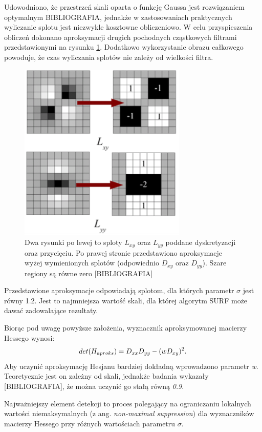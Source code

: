 Udowodniono, że przestrzeń skali oparta o funkcję Gaussa jest rozwiązaniem optymalnym {BIBLIOGRAFIA}, jednakże w zastosowaniach praktycznych wyliczanie splotu jest niezwykle kosztowne obliczeniowo. W celu przyspieszenia obliczeń dokonano aproksymacji drugich pochodnych cząstkowych filtrami przedstawionymi na rysunku \ref{im: GaussianApproximation}. Dodatkowo wykorzystanie obrazu całkowego powoduje, że czas wyliczania splotów nie zależy od wielkości filtra. 
\begin{figure}[h]
	\includegraphics[width=8cm]{SurfLxyLyy}
	\centering
	\caption{Dwa rysunki po lewej to sploty \textit{$L_{xy}$} oraz \textit{$L_{yy}$} poddane dyskretyzacji oraz przycięciu. Po prawej stronie przedstawiono aproksymacje wyżej wymienionych splotów (odpowiednio \textit{$D_{xy}$} oraz \textit{$D_{yy}$}). Szare regiony są równe zero [BIBLIOGRAFIA]}
	\label{im: GaussianApproximation}
\end{figure}
Przedstawione aproksymacje odpowiadają splotom, dla których parametr $\sigma$ jest równy 1.2. Jest to najmniejsza wartość skali, dla której algorytm SURF może dawać zadowalające rezultaty.

Biorąc pod uwagę powyższe założenia, wyznacznik aproksymowanej macierzy Hessego wynosi:
\begin{equation}\textsl{}
det(H_{aproks}) = D_{xx}D_{yy} - (wD_{xy})^2.
\end{equation}
Aby uczynić aproksymację Hesjanu bardziej dokładną wprowadzono parametr \textit{w}. Teoretycznie jest on zależny od skali, jednakże badania wykazały [BIBLIOGRAFIA], że można uczynić go stałą równą \textit{0.9}.  

Najważniejszy element detekcji to proces polegający na ograniczaniu lokalnych wartości niemaksymalnych (z ang. \textit{non-maximal suppression}) dla wyznaczników macierzy Hessego przy różnych wartościach parametru $\sigma$.

